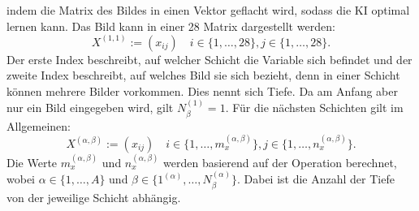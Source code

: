 \documentclass[11pt]{article}
\begin{document}
indem die Matrix des Bildes in einen Vektor geflacht wird, sodass die KI optimal lernen kann.
Das Bild kann in einer 28 Matrix dargestellt werden:
\begin{equation}
    X^{(1,1)} := (x_{ij}) \quad i \in \{1,\ldots,28\}, j \in \{1,\ldots,28\}.
\end{equation}
Der erste Index beschreibt, auf welcher Schicht die Variable sich befindet und der zweite Index beschreibt, auf welches
Bild sie sich bezieht, denn in einer Schicht können mehrere Bilder vorkommen. Dies nennt sich Tiefe. Da am Anfang aber nur ein Bild eingegeben wird, gilt
$N_{\beta}^{(1)} = 1$. Für die nächsten Schichten gilt im Allgemeinen:
\begin{equation}\label{newlayer}
    X^{(\alpha,\beta)} := (x_{ij}) \quad i \in \{1,\ldots,m_{x}^{(\alpha,\beta)}\}, j \in \{1,\ldots,n_{x}^{(\alpha,\beta)}\}.
\end{equation}
Die Werte $m_{x}^{(\alpha,\beta)}$ und $n_{x}^{(\alpha,\beta)}$ werden basierend auf der Operation berechnet, wobei
$\alpha \in \{1,\ldots,A\}$ und $\beta \in \{1^{(\alpha)},\ldots,N_{\beta}^{(\alpha)}\}$. Dabei ist die Anzahl der Tiefe von der jeweilige Schicht abhängig.
\end{document}
